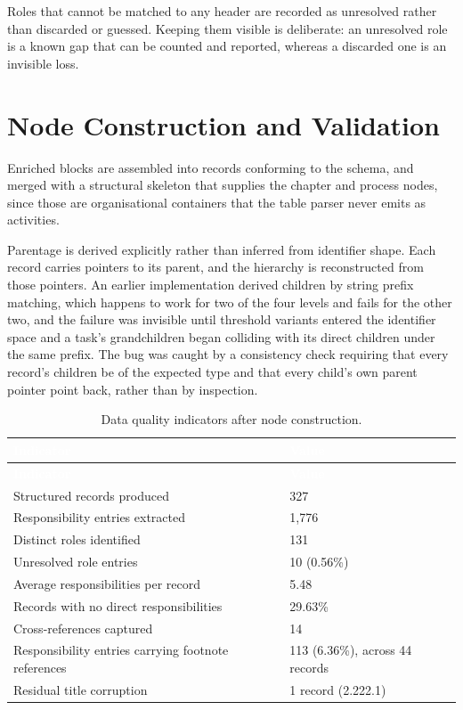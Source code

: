 Roles that cannot be matched to any header are recorded as unresolved rather than discarded or guessed. Keeping them visible is deliberate: an unresolved role is a known gap that can be counted and reported, whereas a discarded one is an invisible loss.

\section{Node Construction and Validation}
\label{sec:nodeconstruction}

Enriched blocks are assembled into records conforming to the schema, and merged with a structural skeleton that supplies the chapter and process nodes, since those are organisational containers that the table parser never emits as activities.

Parentage is derived explicitly rather than inferred from identifier shape. Each record carries pointers to its parent, and the hierarchy is reconstructed from those pointers. An earlier implementation derived children by string prefix matching, which happens to work for two of the four levels and fails for the other two, and the failure was invisible until threshold variants entered the identifier space and a task's grandchildren began colliding with its direct children under the same prefix. The bug was caught by a consistency check requiring that every record's children be of the expected type and that every child's own parent pointer point back, rather than by inspection.

\begin{longtable}{|p{}|p{}|}
\caption{Data quality indicators after node construction.}\label{tab:quality}\\
\hline
\rowcolor{myblue}\textcolor{white}{\textbf{Indicator}} & \textcolor{white}{\textbf{Value}} \\
\hline
\endfirsthead
\hline
\rowcolor{myblue}\textcolor{white}{\textbf{Indicator}} & \textcolor{white}{\textbf{Value}} \\
\hline
\endhead
Structured records produced & 327 \\ \hline
Responsibility entries extracted & 1,776 \\ \hline
Distinct roles identified & 131 \\ \hline
Unresolved role entries & 10 (0.56\%) \\ \hline
Average responsibilities per record & 5.48 \\ \hline
Records with no direct responsibilities & 29.63\% \\ \hline
Cross-references captured & 14 \\ \hline
Responsibility entries carrying footnote references & 113 (6.36\%), across 44 records \\ \hline
Residual title corruption & 1 record (2.222.1) \\ \hline
\end{longtable}

